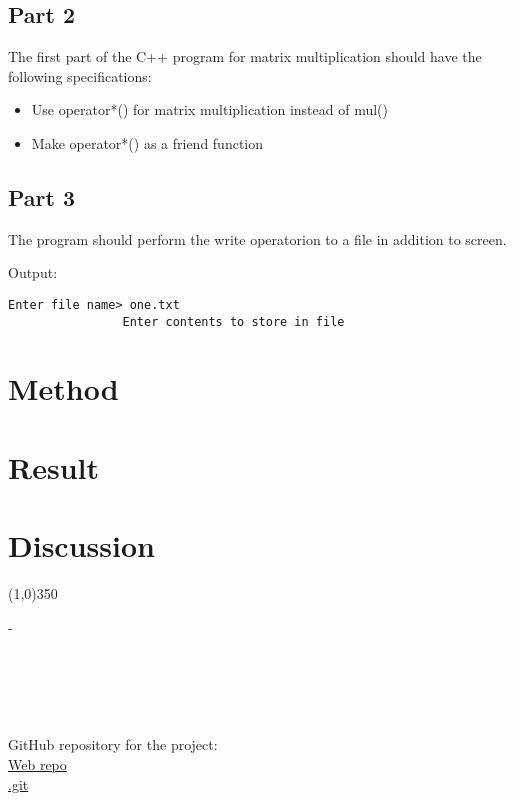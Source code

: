 \documentclass{article}
\begin{document}
		\subsection{Part 2}
			The first part of the C++ program for matrix multiplication should have the following specifications:
			\begin{itemize}
				\item Use operator*() for matrix multiplication instead of mul()
				\item Make operator*() as a friend function
			\end{itemize}
		
		\subsection{Part 3}
			The program should perform the write operatorion to a file in addition to screen.
			
			Output:
			\begin{lstlisting}[style=console]
				Enter file name> one.txt
				Enter contents to store in file
			\end{lstlisting}
			
	
	
	\section{Method}
		
	
	
	\section{Result}
		
	
	
	\section{Discussion}
		
	
	\begin{center}
		\line(1,0){350}
	\end{center}
	-
	\\ \\ \\ \\ \\ \\
	GitHub repository for the project: \\
	\href{https://github.com/catsymptote/matrixMaths}{Web repo} \\
	\href{https://github.com/catsymptote/matrixMaths.git}{.git}
	
	
	\clearpage
	
	
	
\end{document}
